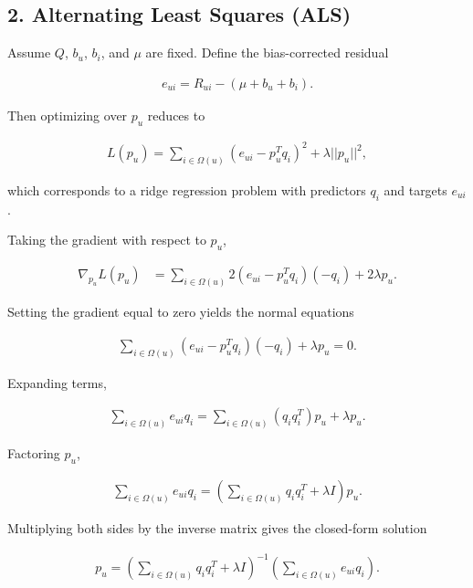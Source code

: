 \documentclass[11pt]{article}
\begin{document}
\begin{appendices}
\vspace{1cm}

\subsection*{2. Alternating Least Squares (ALS)}

Assume $Q$, $b_u$, $b_i$, and $\mu$ are fixed. Define the bias-corrected residual

\begin{align*}
    e_{ui} = R_{ui} - (\mu + b_u + b_i).
\end{align*}

Then optimizing over $p_u$ reduces to

\begin{align*}
    L(p_u)
    =
    \sum_{i \in \Omega(u)}
    (e_{ui} - p_u^T q_i)^2
    +
    \lambda ||p_u||^2,
\end{align*}

which corresponds to a ridge regression problem with predictors $q_i$ and targets $e_{ui}$.

Taking the gradient with respect to $p_u$,

\begin{align*}
    \nabla_{p_u} L(p_u)
    &=
    \sum_{i \in \Omega(u)}
    2(e_{ui} - p_u^T q_i)(-q_i)
    +
    2\lambda p_u.
\end{align*}

Setting the gradient equal to zero yields the normal equations

\begin{align*}
    \sum_{i \in \Omega(u)}
    (e_{ui} - p_u^T q_i)(-q_i)
    + \lambda p_u = 0.
\end{align*}

Expanding terms,

\begin{align*}
    \sum_{i \in \Omega(u)}
    e_{ui} q_i
    =
    \sum_{i \in \Omega(u)}
    (q_i q_i^T)p_u
    +
    \lambda p_u.
\end{align*}

Factoring $p_u$,

\begin{align*}
    \sum_{i \in \Omega(u)}
    e_{ui} q_i
    =
    \left(
    \sum_{i \in \Omega(u)}
    q_i q_i^T
    +
    \lambda I
    \right)
    p_u.
\end{align*}

Multiplying both sides by the inverse matrix gives the closed-form solution

\begin{align*}
    p_u
    =
    \left(
    \sum_{i \in \Omega(u)}
    q_i q_i^T
    +
    \lambda I
    \right)^{-1}
    \left(
    \sum_{i \in \Omega(u)}
    e_{ui} q_i
    \right).
\end{align*}


\end{appendices}
\end{document}
